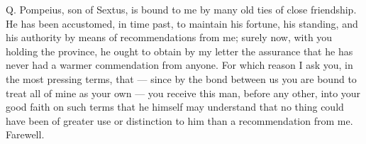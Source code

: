 

Q. Pompeius, son of Sextus, is bound to me by many old ties of close friendship. He has been accustomed, in time past, to maintain his fortune, his standing, and his authority by means of recommendations from me; surely now, with you holding the province, he ought to obtain by my letter the assurance that he has never had a warmer commendation from anyone. For which reason I ask you, in the most pressing terms, that --- since by the bond between us you are bound to treat all of mine as your own --- you receive this man, before any other, into your good faith on such terms that he himself may understand that no thing could have been of greater use or distinction to him than a recommendation from me. Farewell.
